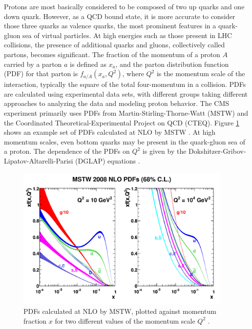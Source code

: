 Protons are most basically considered to be composed of two up quarks and one down quark. However, as a QCD bound state, it is more accurate to consider those three quarks as valence quarks, the most prominent features in a quark-gluon sea of virtual particles. At high energies such as those present in LHC collisions, the presence of additional quarks and gluons, collectively called partons, becomes significant. The fraction of the momentum of a proton $A$ carried by a parton $a$ is defined as $x_a$, and the parton distribution function (PDF) for that parton is $f_{a/A}(x_a,Q^2)$, where $Q^2$ is the momentum scale of the interaction, typically the square of the total four-momentum in a collision. PDFs are calculated using experimental data sets, with different groups taking different approaches to analyzing the data and modeling proton behavior. The CMS experiment primarily uses PDFs from Martin-Stirling-Thorne-Watt (MSTW) and the Coordinated Theoretical-Experimental Project on QCD (CTEQ). Figure \ref{fig:pdf-mstw} shows an example set of PDFs calculated at NLO by MSTW \cite{MSTW09}. At high momentum scales, even bottom quarks may be present in the quark-gluon sea of a proton. The dependence of the PDFs on $Q^2$ is given by the Dokshitzer-Gribov-Lipatov-Altarelli-Parisi (DGLAP) equations \cite{QuarkGluon}.

\begin{figure}[hbt]
\begin{center}
\includegraphics[width=0.95\textwidth]{figures/mstw2008nlo68cl_allpdfs.pdf}
\caption{PDFs calculated at NLO by MSTW, plotted against momentum fraction $x$ for two different values of the momentum scale $Q^2$ \cite{MSTW09}.}
\label{fig:pdf-mstw}
\end{center}
\end{figure}

